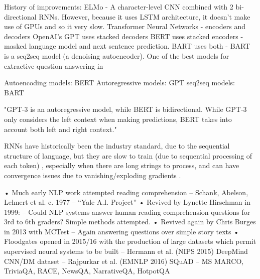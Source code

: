 
History of improvements: 
ELMo - A character-level CNN combined with 2 bi-directional RNNs. However, because it uses LSTM architecture, it doesn't make use of GPUs and so it very slow.
Transformer Neural Networks - encoders and decoders
OpenAI's GPT uses stacked decoders
BERT uses stacked encoders - masked language model and next sentence prediction.
BART uses both - BART is a seq2seq model (a denoising autoencoder). One of the best models for extractive question answering in \citet{pearce2021comparative}

Autoencoding models: BERT
Autoregressive models: GPT
seq2seq models: BART

"GPT-3 is an autoregressive model, while BERT is bidirectional. While GPT-3 only considers the left context when making predictions, BERT takes into account both left and right context."

RNNs have historically been the industry standard, due to the sequential structure of language, but they are slow to train (due to sequential processing of each token) \citep{vaswani2017attention}, especially when there are long strings to process, and can have convergence issues due to vanishing/exploding gradients \citep{Lipton}.

• Much early NLP work attempted reading comprehension
– Schank, Abelson, Lehnert et al. c. 1977 – “Yale A.I. Project”
• Revived by Lynette Hirschman in 1999:
– Could NLP systems answer human reading comprehension questions for 
3rd to 6th graders? Simple methods attempted.
• Revived again by Chris Burges in 2013 with MCTest
– Again answering questions over simple story texts
• Floodgates opened in 2015/16 with the production of large datasets which 
permit supervised neural systems to be built
– Hermann et al. (NIPS 2015) DeepMind CNN/DM dataset
– Rajpurkar et al. (EMNLP 2016) SQuAD
– MS MARCO, TriviaQA, RACE, NewsQA, NarrativeQA, HotpotQA
%

